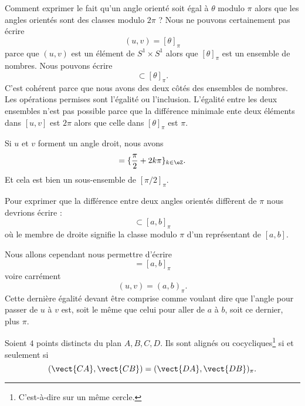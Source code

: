 \begin{normaltext}
	Comment exprimer le fait qu'un angle orienté soit égal à \( \theta\) modulo \( \pi\) alors que les angles orientés sont des classes modulo \( 2\pi\) ? Nous ne pouvons certainement pas écrire
	\begin{equation}
		(u,v)=[\theta]_{\pi}
	\end{equation}
	parce que \( (u,v)\) est un élément de \( S^1\times S^1\) alors que \( [\theta]_{\pi}\) est un ensemble de nombres. Nous pouvons écrire
	\begin{equation}
		[u,v]\subset [\theta]_{\pi}.
	\end{equation}
	C'est cohérent parce que nous avons des deux côtés des ensembles de nombres. Les opérations permises sont l'égalité ou l'inclusion. L'égalité entre les deux ensembles n'est pas possible parce que la différence minimale ente deux éléments dans \( [u,v]\) est \( 2\pi\) alors que celle dans \( [\theta]_{\pi}\) est \( \pi\).

	Si \( u\) et \( v\) forment un angle droit, nous avons
	\begin{equation}
		[u,v]=\{ \frac{ \pi }{2}+2k\pi \}_{k\in \eZ}.
	\end{equation}
	Et cela est bien un sous-ensemble de \( [\pi/2]_{\pi}\).

	Pour exprimer que la différence entre deux angles orientés diffèrent de \( \pi\) nous devrions écrire :
	\begin{equation}
		[u,v]\subset[a,b]_{\pi}
	\end{equation}
	où le membre de droite signifie la classe modulo \( \pi\) d'un représentant de \( [a,b]\).

	Nous allons cependant nous permettre d'écrire
	\begin{equation}
		[u,v]=[a,b]_{\pi}
	\end{equation}
	voire carrément
	\begin{equation}
		(u,v)=(a,b)_{\pi}.
	\end{equation}
	Cette dernière égalité devant être comprise comme voulant dire que l'angle pour passer de \( u\) à \( v\) est, soit le même que celui pour aller de \( a\) à \( b\), soit ce dernier, plus \( \pi\).
\end{normaltext}

\begin{theorem}      \label{THOooUDUGooTJKDpO}
	Soient \( 4\) points distincts du plan \( A,B,C,D\). Ils sont alignés ou cocycliques\footnote{C'est-à-dire sur un même cercle.} si et seulement si
	\begin{equation}
		(\vect{ CA },\vect{ CB })=(\vect{ DA },\vect{ DB })_{\pi}.
	\end{equation}
\end{theorem}

